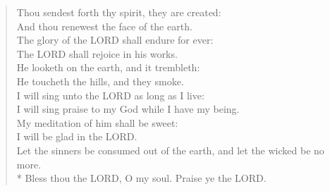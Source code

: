 \documentclass[MAIN]{subfiles}
\begin{document}
\begin{verse}
Thou sendest forth thy spirit, they are created:\\
\vin And thou renewest the face of the earth.\\
The glory of the {\hge LORD} shall endure for ever:\\
\vin The {\hge LORD} shall rejoice in his works.\\
He looketh on the earth, and it trembleth:\\
\vin He toucheth the hills, and they smoke.\\
I will sing unto the {\hge LORD} as long as I live:\\
\vin I will sing praise to my God while I have my being.\\
My meditation of him shall be sweet:\\
\vin I will be glad in the {\hge LORD}.\\
Let the sinners be consumed out of the earth, and let the wicked be no more.\\*
\vin Bless thou the {\hge LORD}, O my soul. Praise ye the {\hge LORD}.
\end{verse}
\end{document}
